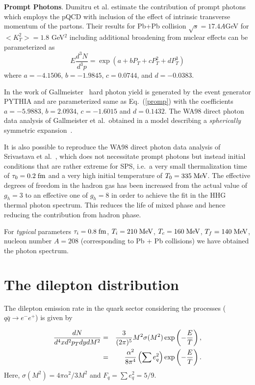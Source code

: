 {\bf Prompt Photons}. 
 Dumitru et al. \cite{DUMI} estimate the contribution of prompt photons 
which employs the pQCD with inclusion of the effect of intrinsic 
transverse momentum of the partons. Their results for Pb+Pb collision
$\sqrt{s} = 17.4 A$GeV for $<K_T^2>=1.8$ GeV$^2$ including additional 
broadening from nuclear effects can be parameterized as 
\begin{equation}\label{promp}
 E \frac{d^3 N}{d^3 p} = \exp(a + bP_T + cP_T^2 + dP_T^3)
\end{equation}
where $a=-4.1506$, $b=-1.9845$, $c=0.0744$, and 
$d=-0.0383$.

 In the work of Gallmeister~\cite{GALLMEISTER} hard photon 
 yield is generated by the event generator PYTHIA and are
parameterized same as Eq.~(\ref{promp}) with the coefficients
$a=-5.9883$, $b=2.0934$, $c=-1.6015$ and $d=0.1432$.
 The WA98 direct photon data analysis of Gallmeister et al.\ obtained in 
a model describing a {\em spherically} symmetric 
expansion~\cite{GALLMEISTER}.

 It is also possible to reproduce the WA98 direct photon data analysis of
Srivastava et al.~\cite{SRIVASTAVA}, which does not necessitate prompt
photons but instead initial conditions that are rather extreme for SPS, i.e.\ a
very small thermalization time of $\tau_0 = 0.2\;\mbox{fm}$ and a very high initial
temperature of $T_0 = 335\;\mbox{MeV}$. 
The effective degrees of freedom in the hadron gas has been increased
from the actual value of $g_h = 3$ to an effective one of $g_h =8$ in order 
to achieve the fit in the HHG thermal photon spectrum. This reduces
the life of mixed phase and hence reducing the contribution from 
hadron phase.


For {\em typical} parameters 
%
$\tau_i = 0.8\;\mbox{fm}$, $T_i = 210\;\mbox{MeV}$, $T_c = 160\;\mbox{MeV}$, $T_f = 140\;\mbox{MeV}$, 
%
nucleon number $A=208$ (corresponding to Pb + Pb collisions)
we have obtained the photon spectrum.


\section{The dilepton distribution}

 The dilepton emission rate in the quark sector considering the 
processes ($q \bar q \rightarrow e^- e^+$)
is given \cite{KAJA,VOGT} by 

\begin{eqnarray}\label{}
 {dN \over d^4x d^2p_T dy dM^2}
&=& \frac{3}{(2\pi)^5} M^2 \sigma(M^2)
        \exp\left(-\frac{E}{T}\right), \nonumber \\
&=& \frac{\alpha^2}{8\pi^4} \left(\sum e_q^2\right) 
        \exp\left(-\frac{E}{T}\right).
\end{eqnarray}
Here, $\sigma(M^2)=4\pi\alpha^2/3M^2$ and $F_q = \sum e_q^2 = 5/9$.

